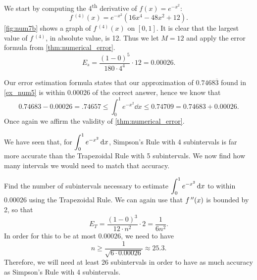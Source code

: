 \begin{example}
We start by computing the 4\textsuperscript{th} derivative of $f(x) = e^{-x^2}$:
%
%
\[f\,^{(4)}(x) = e^{-x^2}(16x^4-48x^2+12).\]
\autoref{fig:num7b} shows a graph of $f\,^{(4)}(x)$ on $[0,1]$. It is clear that the largest value of $f\,^{(4)}$, in absolute value, is 12. Thus we let $M=12$ and apply the error formula from \autoref{thm:numerical_error}.
\[E_s = \frac{(1-0)^5}{180\cdot 4^4}\cdot 12 = 0.00026.\]

Our error estimation formula states that our approximation of $0.7468\overline{3}$ found in \autoref{ex_num5} is within 0.00026 of the correct answer, hence we know that
\[0.74683-0.00026 = .74657 \leq \int_0^1e^{-x^2}\dd x \leq 0.74709 = 0.74683 + 0.00026.\]
Once again we affirm the validity of \autoref{thm:numerical_error}.
\end{example}

We have seen that, for $\displaystyle\int_0^1 e^{-x^2}\operatorname{d}\! x$, Simpson's Rule with 4 subintervals is far more accurate than the Trapezoidal Rule with 5 subintervals.  We now find how many intervals we would need to match that accuracy.

\begin{example}\label{ex_num_find_num_sub_int}%
Find the number of subintervals necessary to estimate $\displaystyle\int_0^1 e^{-x^2}\operatorname{d}\! x$ to within $0.00026$ using the Trapezoidal Rule.
\solution
We can again use that $f\,''(x)$ is bounded by 2, so that
\[E_T=\frac{(1-0)^3}{12\cdot n^2}\cdot 2=\frac1{6n^2}.\]
In order for this to be at most $0.00026$, we need to have
\[n\ge\frac1{\sqrt{6\cdot0.00026}}\approx25.3.\]
Therefore, we will need at least 26 subintervals in order to have as much accuracy as Simpson's Rule with 4 subintervals.
\end{example}

